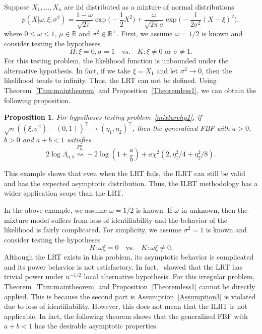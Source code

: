 \documentclass[11pt]{article}
\theoremstyle{plain}
\newtheorem{proposition}{\quad\quad Proposition}
\theoremstyle{definition}
\theoremstyle{remark}
\begin{document}
Suppose $X_1,\ldots,X_n$ are iid distributed as a mixture of normal distributions
\begin{equation*}
    p(X|\omega,\xi,\sigma^2)=\frac{1-\omega}{\sqrt{2\pi}}\exp\big(-\frac{1}{2}X^2\big)
+\frac{\omega}{\sqrt{2\pi}\sigma}\exp\big(-\frac{1}{2\sigma^2}(X-\xi)^2\big),
\end{equation*}
where $0\leq \omega \leq 1$, $\mu\in \mathbb{R}$ and $\sigma^2\in \mathbb{R}^+$.
First, we assume $\omega=1/2$ is known and consider testing the hypotheses
\begin{equation}
    H: \xi=0,\sigma=1\quad \text{vs.} \quad K: \xi\neq 0 \text{ or } \sigma \neq 1.
    \label{mixturehy1}
\end{equation}
For this testing problem, the likelihood function is unbounded under the alternative hypothesis.
In fact, if we take $\xi=X_1$ and let $\sigma^2\to 0$, then the likelihood tends to infinity.
Thus, the LRT can not be defined.
Using Theorem~\ref{Thm:maintheorem} and Proposition~\ref{Theoremless1}, we can obtain the following proposition.
\begin{proposition}
For hypotheses testing problem~\eqref{mixturehy1}, 
if $\sqrt{n}((\xi,\sigma^2)-(0,1))^\top \to (\eta_1,\eta_2)^\top  $, 
then the generalized FBF with $a>0$, $b>0$ and $a+b<1$ satisfies
\begin{equation*}
    2\log \Lambda_{a,b}\overset{P^n_{\theta_n}}{\rightsquigarrow}-2\log (1+\frac{a}{b})+{a}\chi^2(2,\eta_1^2/4+\eta_2^2/8).
\end{equation*}
    \label{propositionTT}
\end{proposition}
This example shows that even when the LRT fails, the ILRT can still be valid and has the expected asymptotic distribution.
Thus, the ILRT methodology has a wider application scope than the LRT.


In the above example, we assume $\omega=1/2$ is known.
If $\omega$ in unknown, then the mixture model suffers from loss of identifiability and the behavior of the likelihood is fairly complicated.
For simplicity, we assume $\sigma^2=1$ is known and consider testing the hypotheses
\begin{equation}
    H:\omega \xi=0
    \quad \text{vs.}\quad
    K:\omega \xi \neq 0.
    \label{newHy}
\end{equation}
Although the LRT exists in this problem, its asymptotic behavior is complicated and its power behavior is not satisfactory.
In fact,~\cite{HALL2005158} showed that the LRT has trivial power under $n^{-1/2}$ local alternative hypothesis. 
For this irregular problem, Theorem~\ref{Thm:maintheorem} and Proposition~\ref{Theoremless1} cannot be directly applied.
This is because the second part is Assumption~\eqref{Assumption3} is violated due to loss of identifiability.
However, this does not mean that the ILRT is not applicable.
In fact, the following theorem shows that the generalized FBF with $a+b<1$ has the desirable asymptotic properties.
\end{document}
